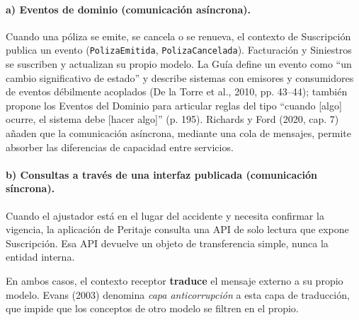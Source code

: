 \documentclass[11pt,a4paper]{article}
\begin{document}
\paragraph{a) Eventos de dominio (comunicación asíncrona).} Cuando una póliza se emite, se cancela o se renueva, el contexto de Suscripción publica un evento (\texttt{PolizaEmitida}, \texttt{PolizaCancelada}). Facturación y Siniestros se suscriben y actualizan su propio modelo. La Guía define un evento como ``un cambio significativo de estado'' y describe sistemas con emisores y consumidores de eventos débilmente acoplados (De la Torre et al., 2010, pp. 43--44); también propone los Eventos del Dominio para articular reglas del tipo ``cuando [algo] ocurre, el sistema debe [hacer algo]'' (p. 195). Richards y Ford (2020, cap. 7) añaden que la comunicación asíncrona, mediante una cola de mensajes, permite absorber las diferencias de capacidad entre servicios.

\paragraph{b) Consultas a través de una interfaz publicada (comunicación síncrona).} Cuando el ajustador está en el lugar del accidente y necesita confirmar la vigencia, la aplicación de Peritaje consulta una API de solo lectura que expone Suscripción. Esa API devuelve un objeto de transferencia simple, nunca la entidad interna.

En ambos casos, el contexto receptor \textbf{traduce} el mensaje externo a su propio modelo. Evans (2003) denomina \emph{capa anticorrupción} a esta capa de traducción, que impide que los conceptos de otro modelo se filtren en el propio.
\end{document}
